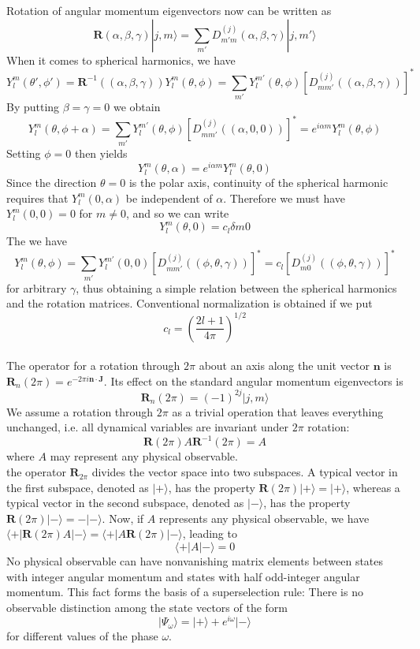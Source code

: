 Rotation of angular momentum eigenvectors now can be written as
\[\bm{R}(\alpha,\beta,\gamma)|j,m\rangle = \sum_{m'} D_{m'm}^{(j)}(\alpha,\beta,\gamma) |j,m'\rangle\]
When it comes to spherical harmonics, we have
\[Y_l^m(\theta',\phi') = \bm{R}^{-1}((\alpha,\beta,\gamma)) Y_l^m(\theta,\phi) = \sum_{m'} Y_{l}^{m'}(\theta,\phi) [D_{mm'}^{(j)}((\alpha,\beta,\gamma))]^*\]
By putting $\beta = \gamma = 0$ we obtain
\[Y_l^m(\theta,\phi+\alpha) = \sum_{m'} Y_{l}^{m'}(\theta,\phi) [D_{mm'}^{(j)}((\alpha,0,0))]^* = e^{i\alpha m} Y_{l}^{m}(\theta,\phi)\]
Setting $\phi=0$ then yields
\[Y_l^m(\theta,\alpha) = e^{i\alpha m} Y_{l}^{m}(\theta,0)\]
Since the direction $\theta = 0$ is the polar axis, continuity of the spherical harmonic requires that $Y_l^m(0,\alpha)$ be independent of $\alpha$. Therefore we must
have $Y_l^m(0,0) = 0$ for $m \neq 0$, and so we can write\\
\[Y_{l}^{m}(\theta,0) = c_{l}\delta{m0}\]
The we have
\[Y_l^m(\theta,\phi) = \sum_{m'} Y_{l}^{m'}(0,0) [D_{mm'}^{(j)}((\phi,\theta,\gamma))]^* = c_l [D_{m0}^{(j)}((\phi,\theta,\gamma))]^*\]
for arbitrary $\gamma$, thus obtaining a simple relation between the spherical harmonics and the rotation matrices. Conventional normalization is obtained if we put
\[c_l = \left( \frac{2l+1}{4\pi} \right) ^{1/2}\]
\\
The operator for a rotation through $2\pi$ about an axis
along the unit vector $\bm{n}$ is $\bm{R}_n(2\pi) = e^{-2\pi i\bm{n}\cdot\bm{J}}$. Its effect on the standard angular momentum eigenvectors is
\[\bm{R}_n(2\pi) = (-1)^{2j}|j,m\rangle \]
We assume a rotation through $2\pi$ as a trivial operation that leaves everything unchanged, i.e. all dynamical variables are invariant under $2\pi$ rotation:
\[\bm{R}(2\pi) A \bm{R}^{-1}(2\pi) = A\]
where $A$ may represent any physical observable. \\
the operator $\bm{R}_{2\pi}$ divides the vector space into two subspaces. A typical vector in the first subspace,
denoted as $|+\rangle$, has the property $\bm{R}(2\pi)|+\rangle = |+\rangle$, whereas a typical vector in the second subspace, denoted as $|-\rangle$, has the property $\bm{R}(2\pi)|-\rangle = -|-\rangle$. Now, if $A$ represents any physical observable, we have $\langle + | \bm{R}(2\pi) A| - \rangle = \langle + | A\bm{R}(2\pi)| - \rangle$, leading to 
\[\langle + | A | - \rangle = 0\] 
No physical observable can have nonvanishing matrix elements between states with integer angular momentum and states with half odd-integer angular momentum. This fact forms the basis of a superselection rule: There is no observable distinction among the state vectors of the form\\
\[|\Psi_{\omega}\rangle = |+\rangle + e^{i\omega}|-\rangle\]
for different values of the phase $\omega$.


